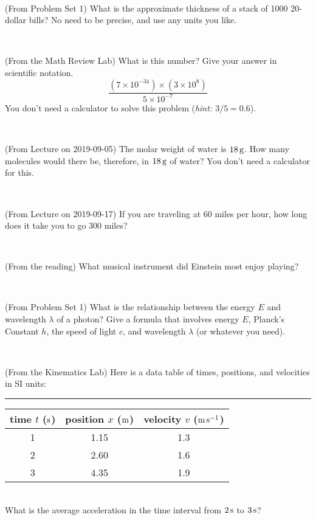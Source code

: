 \documentclass[12pt, letterpaper]{article}
\begin{document}
\vfill ~

\begin{problem} (From Problem Set 1)
What is the approximate thickness of a stack of 1000 20-dollar bills?
No need to be precise, and use any units you like.
\end{problem}


\vfill ~

\begin{problem} (From the Math Review Lab)
What is this number? Give your answer in scientific notation.
$$
\frac{(7\times10^{-34})\times(3\times10^8)}{5\times10^{-7}}
$$
You don't need a calculator to solve this problem (\textit{hint: $3/5=0.6$}).
\end{problem}


\vfill ~

\begin{problem} (From Lecture on 2019-09-05)
The molar weight of water is $18\,\mathrm{g}$. How many molecules would there
be, therefore, in $18\,\mathrm{g}$ of water? You don't need a calculator for
this.
\end{problem}


\vfill ~


\clearpage


\begin{problem} (From Lecture on 2019-09-17)
If you are traveling at 60 miles per hour, how long does
it take you to go 300 miles?
\end{problem}


\vfill ~

\begin{problem} (From the reading)
What musical instrument did Einstein most enjoy playing?
\end{problem}


\vfill ~

\begin{problem} (From Problem Set 1)
What is the relationship between the energy $E$ and wavelength
$\lambda$ of a photon? Give a formula that involves energy $E$,
Planck's Constant $h$, the speed of light $c$, and wavelength
$\lambda$ (or whatever you need).
\end{problem}

\vfill ~

\begin{problem} (From the Kinematics Lab)
Here is a data table of times, positions, and velocities in SI units:\\
\rule{1.0in}{0pt}\begin{tabular}{c|c|c}
time $t$ ($\mathrm{s}$) & position $x$ ($\mathrm{m}$) & velocity $v$ ($\mathrm{m}\,\mathrm{s}^{-1}$) \\
\hline
1 & 1.15 & 1.3 \\
2 & 2.60 & 1.6 \\
3 & 4.35 & 1.9 \\
\hline
\end{tabular}\\
What is the average acceleration in the time interval from $2\,\mathrm{s}$ to $3\,\mathrm{s}$?
\end{problem}
\end{document}
